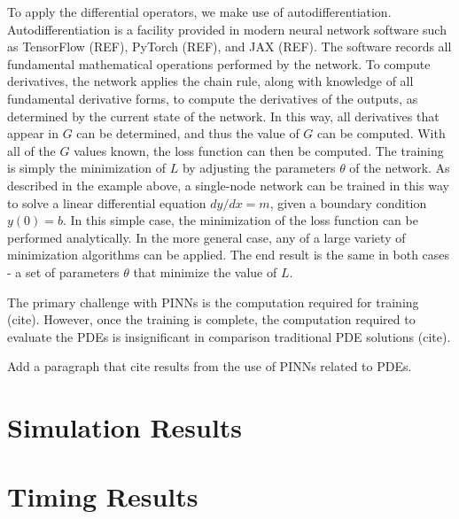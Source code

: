 \documentclass[]{article}
\begin{document}
To apply the differential operators, we make use of autodifferentiation. Autodifferentiation is a facility provided in modern neural network software such as TensorFlow (REF), PyTorch (REF), and JAX (REF). The software records all fundamental mathematical operations performed by the network. To compute derivatives, the network applies the chain rule, along with knowledge of all fundamental derivative forms, to compute the derivatives of the outputs, as determined by the current state of the network. In this way, all derivatives that appear in $G$ can be determined, and thus the value of $G$ can be computed. With all of the $G$ values known, the loss function can then be computed. The training is simply the minimization of $L$ by adjusting the parameters $\theta$ of the network. As described in the example above, a single-node network can be trained in this way to solve a linear differential equation $dy/dx = m$, given a boundary condition $y(0) = b$. In this simple case, the minimization of the loss function can be performed analytically. In the more general case, any of a large variety of minimization algorithms can be applied. The end result is the same in both cases - a set of parameters $\theta$ that minimize the value of $L$.

The primary challenge with PINNs is the computation required for training (cite). However, once the training is complete, the computation required to evaluate the PDEs is insignificant in comparison traditional PDE solutions (cite).

Add a paragraph that cite results from the use of PINNs related to PDEs.

\section{Simulation Results}





\section{Timing Results}
\end{document}

